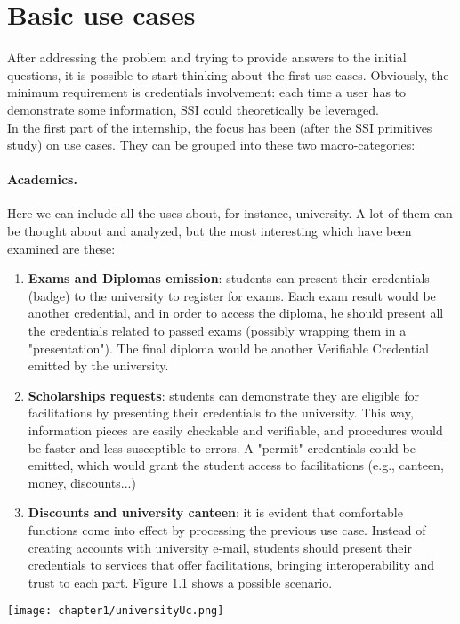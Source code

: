 \section{Basic use cases}
After addressing the problem and trying to provide answers to the initial 
questions, it is possible to start thinking about the first use cases.
Obviously, the minimum requirement is credentials involvement: each time a user 
has to demonstrate some information, SSI could theoretically be leveraged.
\vspace*{0.3cm}\\
In the first part of the internship, the focus has been (after the SSI primitives 
study) on use cases. They can be grouped into these two macro-categories:
\paragraph{Academics.}
Here we can include all the uses about, for instance, university. A lot of them 
can be thought about and analyzed, but the most interesting which have been examined 
are these:
\begin{enumerate}
    \item \textbf{Exams and Diplomas emission}: students can present 
    their credentials (badge) to the university to register for exams. 
    Each exam result would be another credential, and in order to access the 
    diploma, he should present all the credentials related to passed exams 
    (possibly wrapping them in a "presentation"). The final diploma would 
    be another Verifiable Credential emitted by the university.
    \item \textbf{Scholarships requests}: students can demonstrate they are 
    eligible for facilitations by presenting their credentials to the university. 
    This way, information pieces are easily checkable and verifiable, and procedures 
    would be faster and less susceptible to errors. A "permit" credentials could be 
    emitted, which would grant the student access to facilitations (e.g., canteen,  
    money, discounts...)
    \item \textbf{Discounts and university canteen}: it is evident that comfortable
    functions come into effect by processing the previous use case. Instead of 
    creating accounts with university e-mail, students should present their 
    credentials to services that offer facilitations, bringing interoperability 
    and trust to each part. Figure 1.1 shows a possible scenario.
\end{enumerate}
\begin{center}
    \texttt{[image: chapter1/universityUc.png]}
\end{center}
    
